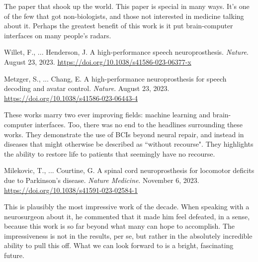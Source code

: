 \begin{adjustwidth}{1cm}{1cm}
The paper that shook up the world. This paper is special in many ways. It's one of the few that got non-biologists, and those not interested in medicine talking about it. Perhaps the greatest benefit of this work is it put brain-computer interfaces on many people's radars. \newline
\end{adjustwidth}

Willet, F., ... Henderson, J. A high-performance speech neuroprosthesis. \textit{Nature}. August 23, 2023. \url{https://doi.org/10.1038/s41586-023-06377-x}\newline

Metzger, S., ... Chang, E. A high-performance neuroprosthesis for speech decoding and avatar control. \textit{Nature}. August 23, 2023. \url{https://doi.org/10.1038/s41586-023-06443-4}

\begin{adjustwidth}{1cm}{1cm}
These works marry two ever improving fields: machine learning and brain-computer interfaces. Too, there was no end to the headlines surrounding these works. They demonstrate the use of BCIs beyond neural repair, and instead in diseases that might otherwise be described as ``without recourse". They highlights the ability to restore life to patients that seemingly have no recourse.  \newline
\end{adjustwidth}


Milekovic, T., ... Courtine, G. A spinal cord neuroprosthesis for locomotor deficits due to Parkinson’s disease. \textit{Nature Medicine}. November 6, 2023. \url{https://doi.org/10.1038/s41591-023-02584-1}

\begin{adjustwidth}{1cm}{1cm}
This is plausibly the most impressive work of the decade. When speaking with a neurosurgeon about it, he commented that it made him feel defeated, in a sense, because this work is so far beyond what many can hope to accomplish. The impressiveness is not in the results, per se, but rather in the absolutely incredible ability to pull this off. What we can look forward to is a bright, fascinating future. \newline
\end{adjustwidth}



\vfill\pagebreak

